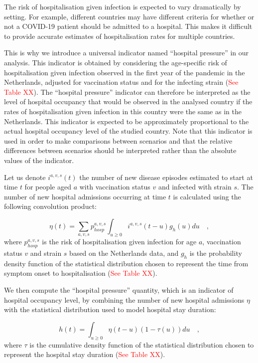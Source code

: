 The risk of hospitalisation given infection is expected to vary dramatically by setting.
For example, different countries may have different criteria for whether or not a COVID-19 
patient should be admitted to a hospital. This makes it difficult to provide accurate 
estimates of hospitalisation rates for multiple countries. 

This is why we introduce a universal indicator named ``hospital pressure'' in our analysis. This indicator
is obtained by considering the age-specific risk of hospitalisation given infection observed in the first year
of the pandemic in the Netherlands, adjusted for vaccination status and for the infecting strain (\textcolor{red}{See Table XX}).
The ``hospital pressure'' indicator can therefore be interpreted as the level of hospital occupancy that
would be observed in the analysed country if the rates of hospitalisation given infection in this country were the same
as in the Netherlands. This indicator is expected to be approximately proportional to the actual hospital occupancy level of the 
studied country. Note that this indicator is used in order to make comparisons between scenarios and that the relative
differences between scenarios should be interpreted rather than the absolute values of the indicator. 

Let us denote $i^{a,v,s}(t)$ the number of new disease episodes estimated to start at time $t$ for people aged $a$ with vaccination status $v$
and infected with strain $s$. The number of new hospital admissions occurring at time $t$ is calculated using the following
convolution product:

$$ \eta(t) = \sum_{a,v,s} p_{hosp}^{a,v,s} \int_{u \geq 0}  i^{a,v,s}(t-u)g_{h}(u) du   \quad,$$ 
where $p_{hosp}^{a,v,s}$ is the risk of hospitalisation given infection for age $a$, vaccination status $v$ and strain $s$ 
based on the Netherlands data, and $g_h$ is the probability density function of the statistical distribution chosen to represent the 
time from symptom onset to hospitalisation (\textcolor{red}{See Table XX}). 

We then compute the ``hospital pressure'' quantity, which is an indicator of hospital occupancy level, by combining the number of new 
hospital admissions $\eta$ with the statistical distribution used to model hospital stay duration:

$$ h(t) = \int_{u \geq 0}  \eta(t-u) (1 - \tau(u)) du   \quad,$$ 
where $\tau$ is the cumulative density function of the statistical distribution chosen to represent the 
hospital stay duration (\textcolor{red}{See Table XX}). 
